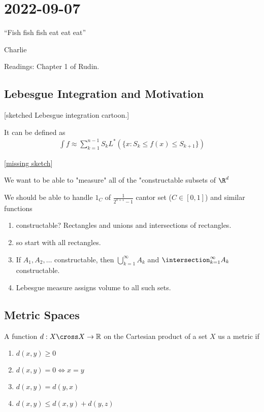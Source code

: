 \section{2022-09-07}

\epigraph{``Fish fish fish eat eat eat''}{Charlie}

Readings: Chapter 1 of Rudin.

\subsection{Lebesgue Integration and Motivation}

[sketched Lebesgue integration cartoon.]

It can be defined as 
\begin{align*}
	\int f \approx \sum_{k=1}^{n-1} S_k L^* (\{x : S_k \leq f(x) \leq S_{k+1}\})
\end{align*} 

[\underline{missing sketch}]

We want to be able to "measure" all of the "constructable subsets of $\R^d$

We should be able to handle $1_C$ of $\frac{1}{2^{k+1} -1 }$ cantor set ($C \in [0,1]$) and similar functions

\begin{enumerate}
	\item constructable? Rectangles and unions and intersections of rectangles.
	\item so start with all rectangles.
	\item If $A_1, A_2, \ldots$ constructable, then
		$\bigcup_{k=1}^{\infty}A_k$ and $\intersection_{k=1}^{\infty}A_k$ constructable.
	\item Lebesgue measure assigns volume to all such sets.
\end{enumerate}
 
\subsection{Metric Spaces}

A function $d : X \cross X \to \mathbb{R}$ on the Cartesian product of a set  $X$ us a metric if

\begin{enumerate}
	\item $d(x,y) \geq 0$
	\item $d(x,y) = 0 \iff x = y$
	\item $d(x,y) = d(y,x)$
	\item $d(x,y) \leq d(x,y) + d(y,z)$
\end{enumerate}

